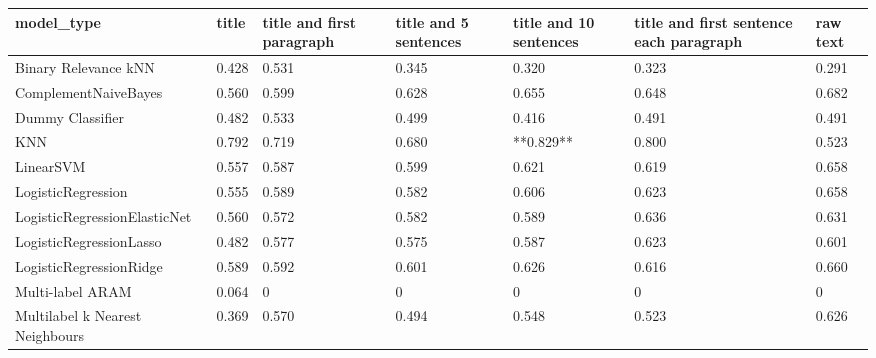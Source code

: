 \begin{tabular}{lllllll}
\toprule
                     model\_type & title & title and first paragraph & title and 5 sentences & title and 10 sentences & title and first sentence each paragraph & raw text \\
\midrule
           Binary Relevance kNN & 0.428 &                     0.531 &                 0.345 &                  0.320 &                                   0.323 &    0.291 \\
           ComplementNaiveBayes & 0.560 &                     0.599 &                 0.628 &                  0.655 &                                   0.648 &    0.682 \\
               Dummy Classifier & 0.482 &                     0.533 &                 0.499 &                  0.416 &                                   0.491 &    0.491 \\
                            KNN & 0.792 &                     0.719 &                 0.680 &              **0.829** &                                   0.800 &    0.523 \\
                      LinearSVM & 0.557 &                     0.587 &                 0.599 &                  0.621 &                                   0.619 &    0.658 \\
             LogisticRegression & 0.555 &                     0.589 &                 0.582 &                  0.606 &                                   0.623 &    0.658 \\
   LogisticRegressionElasticNet & 0.560 &                     0.572 &                 0.582 &                  0.589 &                                   0.636 &    0.631 \\
        LogisticRegressionLasso & 0.482 &                     0.577 &                 0.575 &                  0.587 &                                   0.623 &    0.601 \\
        LogisticRegressionRidge & 0.589 &                     0.592 &                 0.601 &                  0.626 &                                   0.616 &    0.660 \\
               Multi-label ARAM & 0.064 &                         0 &                     0 &                      0 &                                       0 &        0 \\
Multilabel k Nearest Neighbours & 0.369 &                     0.570 &                 0.494 &                  0.548 &                                   0.523 &    0.626 \\

\end{tabular}
